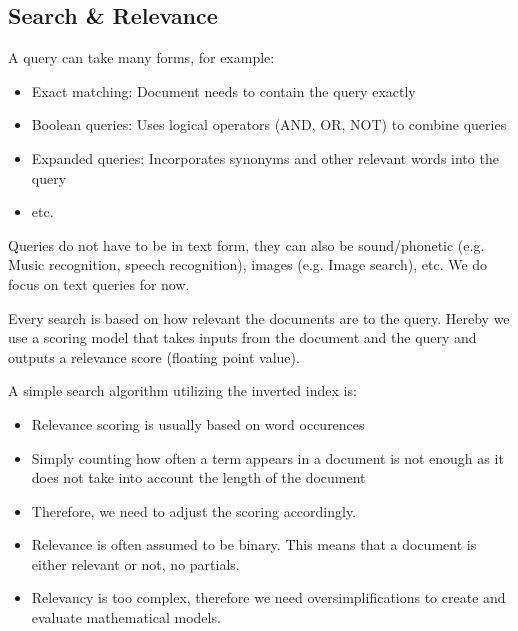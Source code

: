 \documentclass[
../../NLP4W_Summary.tex,
]
{subfiles}
\begin{document}
\subsection{Search \& Relevance}
\begin{defbox}
    A query can take many forms, for example:
    \begin{itemize}
        \item Exact matching: Document needs to contain the query exactly
        \item Boolean queries: Uses logical operators (AND, OR, NOT) to combine queries
        \item Expanded queries: Incorporates synonyms and other relevant words into the query
        \item etc.
    \end{itemize}
    Queries do not have to be in text form, they can also be sound/phonetic (e.g. Music recognition, speech recognition), images (e.g. Image search), etc.
    We do focus on text queries for now.
\end{defbox}

Every search is based on how relevant the documents are to the query. Hereby we use a scoring model that takes inputs from the document and the query and outputs a relevance score (floating point value).

A simple search algorithm utilizing the inverted index is:

\begin{codebox}
    \begin{algorithm}[H]
    \end{algorithm}
\end{codebox}

\begin{defbox}
    \begin{itemize}
        \item Relevance scoring is usually based on word occurences
        \item Simply counting how often a term appears in a document is not enough as it does not take into account the length of the document
        \item Therefore, we need to adjust the scoring accordingly.
        \item Relevance is often assumed to be binary. This means that a document is either relevant or not, no partials.
        \item Relevancy is too complex, therefore we need oversimplifications to create and evaluate mathematical models.
    \end{itemize}
\end{defbox}
\end{document}
